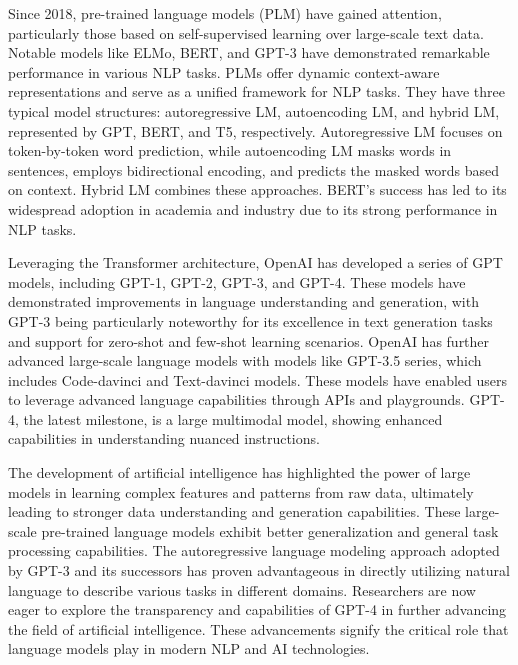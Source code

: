 \documentclass[conference]{IEEEtran}
\begin{document}
Since 2018, pre-trained language models (PLM) have gained attention, particularly those based on self-supervised learning over large-scale text data. Notable models like ELMo, BERT, and GPT-3 have demonstrated remarkable performance in various NLP tasks. PLMs offer dynamic context-aware representations and serve as a unified framework for NLP tasks. They have three typical model structures: autoregressive LM, autoencoding LM, and hybrid LM, represented by GPT, BERT, and T5, respectively. Autoregressive LM focuses on token-by-token word prediction, while autoencoding LM masks words in sentences, employs bidirectional encoding, and predicts the masked words based on context. Hybrid LM combines these approaches. BERT's success has led to its widespread adoption in academia and industry due to its strong performance in NLP tasks.

Leveraging the Transformer architecture, OpenAI has developed a series of GPT models, including GPT-1, GPT-2, GPT-3, and GPT-4. These models have demonstrated improvements in language understanding and generation, with GPT-3 being particularly noteworthy for its excellence in text generation tasks and support for zero-shot and few-shot learning scenarios. OpenAI has further advanced large-scale language models with models like GPT-3.5 series, which includes Code-davinci and Text-davinci models. These models have enabled users to leverage advanced language capabilities through APIs and playgrounds. GPT-4, the latest milestone, is a large multimodal model, showing enhanced capabilities in understanding nuanced instructions.

The development of artificial intelligence has highlighted the power of large models in learning complex features and patterns from raw data, ultimately leading to stronger data understanding and generation capabilities. These large-scale pre-trained language models exhibit better generalization and general task processing capabilities. The autoregressive language modeling approach adopted by GPT-3 and its successors has proven advantageous in directly utilizing natural language to describe various tasks in different domains. Researchers are now eager to explore the transparency and capabilities of GPT-4 in further advancing the field of artificial intelligence. These advancements signify the critical role that language models play in modern NLP and AI technologies.
\end{document}
